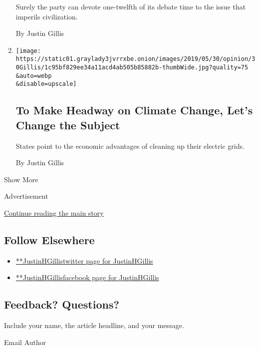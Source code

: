 \begin{enumerate}
  Surely the party can devote one-twelfth of its debate time to the
  issue that imperils civilization.

  By Justin Gillis
\item
  \href{/2019/05/30/opinion/climate-elections-democrats.html}{}

  \texttt{[image: https://static01.graylady3jvrrxbe.onion/images/2019/05/30/opinion/30Gillis/1c95bf829ee34a11acd4ab505b85882b-thumbWide.jpg?quality=75\\\&auto=webp\\\&disable=upscale]}

  \hypertarget{to-make-headway-on-climate-change-lets-change-the-subject}{%
  \subsection{To Make Headway on Climate Change, Let's Change the
  Subject}\label{to-make-headway-on-climate-change-lets-change-the-subject}}

  States point to the economic advantages of cleaning up their electric
  grids.

  By Justin Gillis
\end{enumerate}

Show More

Advertisement

\protect\hyperlink{after-mid2}{Continue reading the main story}

\hypertarget{follow-elsewhere}{%
\subsection{Follow Elsewhere}\label{follow-elsewhere}}

\begin{itemize}
\tightlist
\item
  \href{https://twitter.com/JustinHGillis}{**JustinHGillistwitter page
  for JustinHGillis}
\item
  \href{https://www.facebookcorewwwi.onion/JustinHGillis}{**JustinHGillisfacebook
  page for JustinHGillis}
\end{itemize}

\hypertarget{feedback-questions}{%
\subsection{Feedback? Questions?}\label{feedback-questions}}

Include your name, the article headline, and your message.

Email Author

